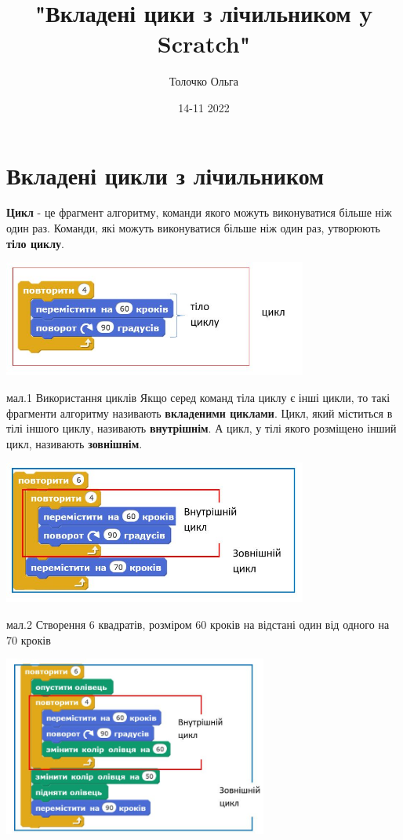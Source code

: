 \documentclass{article}
\title	{"Вкладені цики з лічильником y Scratch"}	\author{Толочко Ольга}
\date{14-11 2022}
\begin{document}
	\maketitle
	\newpage

\section*{Вкладені цикли з лічильником} 

\textbf {Цикл} - це фрагмент алгоритму, команди якого можуть виконуватися більше ніж один раз. 
Команди, які можуть виконуватися більше ніж один раз, утворюють \textbf {тіло циклу}.

	\includegraphics[width=0.75\textwidth]{1}
	
мал.1 Використання циклів
 \newline
Якщо серед команд тіла циклу є інші цикли, то такі фрагменти
алгоритму називають \textbf {вкладеними циклами}.
Цикл, який міститься в тілі іншого циклу, називають\textbf { внутрішнім}. 
А цикл, у тілі якого розміщено інший цикл, називають \textbf {зовнішнім}.

\includegraphics[width=0.75\textwidth]{2}

мал.2 Створення 6 квадратів, розміром 60 кроків на відстані один від одного на 70 кроків

\includegraphics[width=0.65\textwidth]{3}
\end{document}
